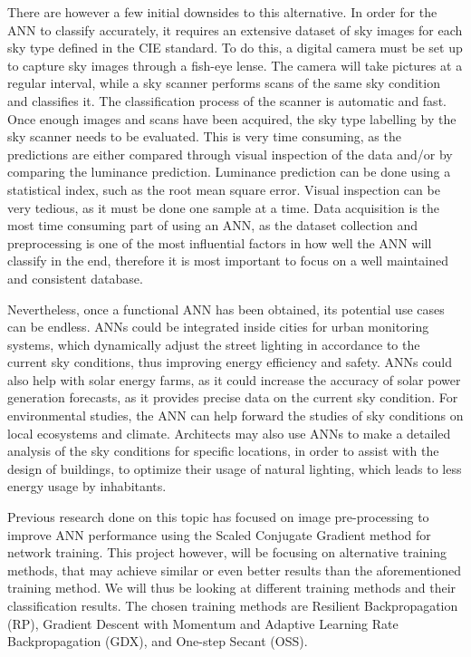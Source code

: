 There are however a few initial downsides to this alternative. In order for the ANN to classify accurately, it requires an extensive dataset of sky images for each sky type defined in the CIE standard. To do this, a digital camera must be set up to capture sky images through a fish-eye lense\cite{skyClassANN-Granados-Lopéz}. The camera will take pictures at a regular interval, while a sky scanner performs scans of the same sky condition and classifies it. The classification process of the scanner is automatic and fast. Once enough images and scans have been acquired, the sky type labelling by the sky scanner needs to be evaluated. This is very time consuming, as the predictions are either compared through visual inspection of the data and/or by comparing the luminance prediction. Luminance prediction can be done using a statistical index, such as the root mean square error. Visual inspection can be very tedious, as it must be done one sample at a time. Data acquisition is the most time consuming part of using an ANN, as the dataset collection and preprocessing is one of the most influential factors in how well the ANN will classify in the end, therefore it is most important to focus on a well maintained and consistent database.

Nevertheless, once a functional ANN has been obtained, its potential use cases can be endless. ANNs could be integrated inside cities for urban monitoring systems, which dynamically adjust the street lighting in accordance to the current sky conditions, thus improving energy efficiency and safety. \cite{ANN-Applications} ANNs could also help with solar energy farms, as it could increase the accuracy of solar power generation forecasts, as it provides precise data on the current sky condition. For environmental studies, the ANN can help forward the studies of sky conditions on local ecosystems and climate. Architects may also use ANNs to make a detailed analysis of the sky conditions for specific locations, in order to assist with the design of buildings, to optimize their usage of natural lighting, which leads to less energy usage by inhabitants.

Previous research done on this topic has focused on image pre-processing to improve ANN performance using the Scaled Conjugate Gradient method for network training. \cite{skyClassANN-Granados-Lopéz} This project however, will be focusing on alternative training methods, that may achieve similar or even better results than the aforementioned training method. We will thus be looking at different training methods and their classification results. The chosen training methods are Resilient Backpropagation (RP), Gradient Descent with Momentum and Adaptive Learning Rate Backpropagation (GDX), and One-step Secant (OSS). 

